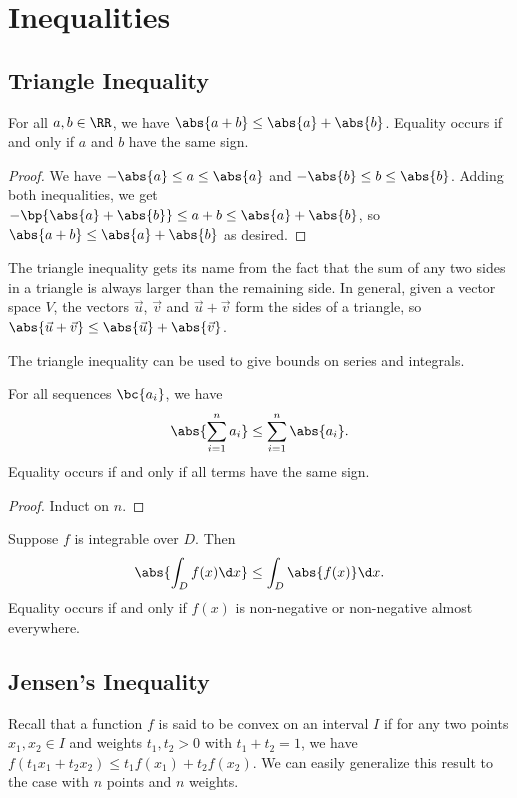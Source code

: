 \chapter{Inequalities}

\section{Triangle Inequality}

\begin{theorem}
    For all $a, b \in \RR$, we have $\abs{a + b} \leq \abs{a} + \abs{b}$. Equality occurs if and only if $a$ and $b$ have the same sign.
\end{theorem}
\begin{proof}
    We have $-\abs{a} \leq a \leq \abs{a}$ and $-\abs{b} \leq b \leq \abs{b}$. Adding both inequalities, we get $-\bp{\abs{a} + \abs{b}} \leq a + b \leq \abs{a} + \abs{b}$, so $\abs{a + b} \leq \abs{a} + \abs{b}$ as desired.
\end{proof}

The triangle inequality gets its name from the fact that the sum of any two sides in a triangle is always larger than the remaining side. In general, given a vector space $V$, the vectors $\vec u$, $\vec v$ and $\vec u + \vec v$ form the sides of a triangle, so $\abs{\vec u + \vec v} \leq \abs{\vec u} + \abs{\vec v}$.

The triangle inequality can be used to give bounds on series and integrals.

\begin{corollary}
    For all sequences $\bc{a_i}$, we have \[\abs{\sum_{i = 1}^n a_i} \leq \sum_{i = 1}^n \abs{a_i}.\] Equality occurs if and only if all terms have the same sign.
\end{corollary}
\begin{proof}
    Induct on $n$.
\end{proof}

\begin{corollary}
    Suppose $f$ is integrable over $D$. Then \[\abs{\int_D f(x) \d x} \leq \int_D \abs{f(x)} \d x.\] Equality occurs if and only if $f(x)$ is non-negative or non-negative almost everywhere.
\end{corollary}

\section{Jensen's Inequality}

Recall that a function $f$ is said to be convex on an interval $I$ if for any two points $x_1, x_2 \in I$ and weights $t_1, t_2 > 0$ with $t_1 + t_2 = 1$, we have $f(t_1 x_1 + t_2 x_2) \leq t_1 f(x_1) + t_2 f(x_2)$. We can easily generalize this result to the case with $n$ points and $n$ weights.

